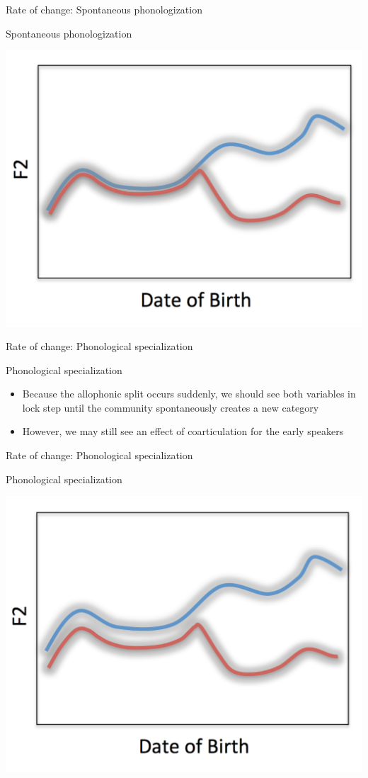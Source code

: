 \documentclass[hyperref={pdfpagelabels=false}]{beamer}
\begin{document}
\begin{frame}{Rate of change: Spontaneous phonologization}
	\begin{block}{Spontaneous phonologization}
		\begin{center}
		\includegraphics[trim=2cm 2cm 2cm 2cm, clip=false, width=.6\textwidth]{SpontROC.pdf}
		\end{center}
	\end{block}	
\end{frame}

\begin{frame}{Rate of change: Phonological specialization}
	\begin{block}{Phonological specialization}
		\begin{itemize}
			\item Because the allophonic split occurs suddenly, we should see both variables in lock step until the community spontaneously creates a new category \pause
			\item However, we may still see an effect of coarticulation for the early speakers
		\end{itemize}
	\end{block}
\end{frame}

\begin{frame}{Rate of change: Phonological specialization}
	\begin{block}{Phonological specialization}
		\begin{center}
		\includegraphics[trim=2cm 2cm 2cm 2cm, clip=false, width=.6\textwidth]{phonspROC.pdf}
		\end{center}
	\end{block}	
\end{frame}
\end{document}
